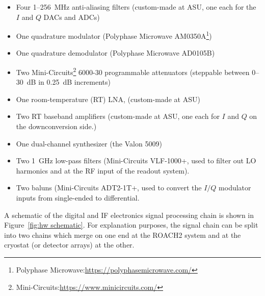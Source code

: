 \begin{itemize}[nosep]
  \item Four 1--256~MHz anti-aliasing filters (custom-made at ASU, one each for the $I$ and $Q$ DACs and ADCs)
  \item One quadrature modulator (Polyphase Microwave AM0350A\footnote{Polyphase Microwave:\url{https://polyphasemicrowave.com/}})
  \item One quadrature demodulator (Polyphase Microwave AD0105B)
  \item Two Mini-Circuits\footnote{Mini-Circuits:\url{https://www.minicircuits.com/}} 6000-30 programmable attenuators (steppable between 0--30~dB in 0.25~dB increments)
  \item One room-temperature (RT) LNA, (custom-made at ASU)
  \item Two RT baseband amplifiers (custom-made at ASU, one each for $I$ and $Q$ on the downconversion side.)
  \item One dual-channel synthesizer (the Valon 5009)
  \item Two 1~GHz low-pass filters (Mini-Circuits VLF-1000+, used to filter out LO harmonics and at the RF input of the readout system).
  \item Two baluns (Mini-Circuits ADT2-1T+, used to convert the $I/Q$ modulator inputs from single-ended to differential.
\end{itemize}

\vspace{5mm}

A schematic of the digital and IF electronics signal processing chain is shown in Figure~\ref{fig:hw schematic}. For explanation purposes, the signal chain can be split into two chains which merge on one end at the ROACH2 system and at the cryostat (or detector arrays) at the other.

